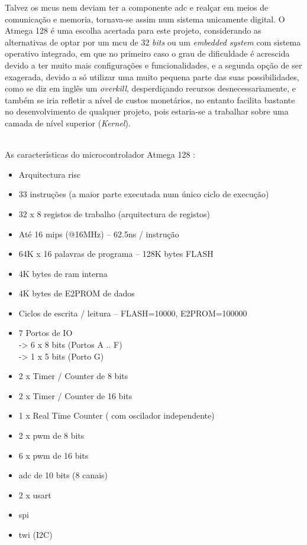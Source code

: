 Talvez os \acsp{mcu} nem deviam ter a componente \acs{adc} e realçar em meios de comunicação e memoria, tornava-se assim num sistema unicamente digital.
O Atmega 128 é uma escolha acertada para este projeto, considerando as alternativas de optar por um \ac{mcu} de 32 \textit{bits} ou um \textit{embedded system} com sistema operativo integrado, em que no primeiro caso o grau de dificuldade é acrescida devido a ter muito mais configurações e funcionalidades, e a segunda opção de ser exagerada, devido a só utilizar uma muito pequena parte das suas possibilidades, como se diz em inglês um \textit{overkill}, desperdiçando recursos desnecessariamente, e também se iria refletir a nível de custos monetários, no entanto facilita bastante no desenvolvimento de qualquer projeto, pois estaria-se a trabalhar sobre uma camada de nível superior (\textit{Kernel}).
\\
\\
\begin{minipage}{\linewidth}
As características do microcontrolador Atmega 128 :
\normalsize
\begin{itemize}	
	\setlength\itemsep{-0.3em}
	\item Arquitectura \acs{risc}
	\item 33 instruções (a maior parte executada num único ciclo de execução)
	\item 32 x 8 registos de trabalho (arquitectura de registos)
	\item Até 16 \acs{mips} (@16MHz) – 62.5ns / instrução
	\item 64K x 16 palavras de programa – 128K bytes FLASH
	\item 4K bytes de \acs{ram} interna
	\item 4K bytes de E2PROM de dados
	\item Ciclos de escrita / leitura – FLASH=10000, E2PROM=100000
	\item 7 Portos de IO \\
		\hspace*{.5cm}	-> 6 x 8 bits (Portos A .. F) \\
		\hspace*{.5cm}	-> 1 x 5 bits (Porto G)
	\item 2 x Timer / Counter de 8 bits
	\item 2 x Timer / Counter de 16 bits
	\item 1 x Real Time Counter ( com oscilador independente)
	\item 2 x \acs{pwm} de 8 bits
	\item 6 x \acs{pwm} de 16 bits
	\item \acs{adc} de 10 bits (8 canais)
	\item 2 x \acs{usart}
	\item \acs{spi}
	\item \acs{twi} (I2C)
\end{itemize}
\end{minipage}
